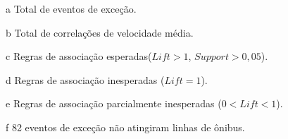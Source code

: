 \documentclass[
	12pt,				%
	oneside,			%
	a4paper,			%
	english,			%
	brazil				%
	]{abntex2ppgsi}
\begin{document}
{{{\begin{apendicesenv}
\begin{table}[!htb]
\begin{threeparttable}
\begin{tablenotes}
            \item[a] Total de eventos de exceção.
            \item[b] Total de correlações de velocidade média.
            \item[c] Regras de associação esperadas($Lift > 1$, $Support > 0,05$).
            \item[d] Regras de associação inesperadas ($Lift = 1$).
            \item[e] Regras de associação parcialmente inesperadas ($0 < Lift < 1$).
            \item[f] 82 eventos de exceção não atingiram linhas de ônibus.
        \end{tablenotes}
\end{threeparttable}
\end{table}


\end{apendicesenv}}}}
\end{document}
